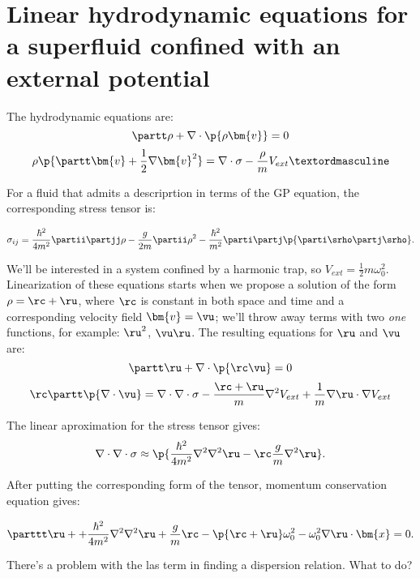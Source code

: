 \documentclass[10pt,letterpaper]{article}
\begin{document}
\section*{Linear hydrodynamic equations for a superfluid confined with an external potential}
The hydrodynamic equations are:
\begin{equation}
\partt \rho + \nabla\cdot\p{\rho\bm{v}} = 0
\label{continuity}
\end{equation}
\begin{equation}
\rho \p{ \partt \bm{v} + \frac{1}{2}\nabla \bm{v}^2 } = \nabla \cdot \sigma - \frac{\rho}{m}V_{ext}º
\label{momentum}
\end{equation}

For a fluid that admits a descriprtion in terms of the GP equation, the corresponding stress tensor is:

\begin{equation}
\sigma_{ij} = \frac{\hbar^2}{4m^2}\partii\partjj \rho - \frac{g}{2m}\partii \rho^2 - \frac{\hbar^2}{m^2}\parti\partj\p{\parti\srho\partj\srho}.
\end{equation}

We'll be interested in a system confined by a harmonic trap, so $V_{ext} =	\frac{1}{2} m\omega_0^2$. Linearization of these equations starts when we propose a solution of the form $\rho = \rc + \ru$, where $\rc$ is constant in both space and time and a corresponding velocity field $\bm{v} = \vu$; we'll throw away terms with two \emph{one} functions, for example: $\ru^2$, $\vu\ru$. The resulting equations for $\ru$ and $\vu$ are:
\begin{equation}
\partt\ru + \nabla\cdot\p{\rc\vu} = 0
\end{equation}
\begin{equation}
\rc\partt \p{\nabla\cdot\vu} = \nabla\cdot\nabla\cdot\sigma - \frac{\rc + \ru}{m}\nabla^2V_{ext} + \frac{1}{m}\nabla\ru\cdot\nabla V_{ext}
\end{equation}

The linear aproximation for the stress tensor gives:
\begin{equation}
\nabla\cdot\nabla\cdot\sigma \approx \p{\frac{\hbar^2}{4m^2}\nabla^2\nabla^2 \ru - \rc\frac{g}{m}\nabla^2 \ru }.
\end{equation}

After putting the corresponding form of the tensor, momentum conservation equation gives:

\begin{equation}
\parttt\ru + +\frac{\hbar^2}{4m^2}\nabla^2\nabla^2\ru + \frac{g}{m}\rc -\p{\rc+\ru}\omega^2_0 - \omega^2_0 \nabla\ru\cdot\bm{x} = 0.
\end{equation}

There's a problem with the las term in finding a dispersion relation. What to do?
\end{document}

